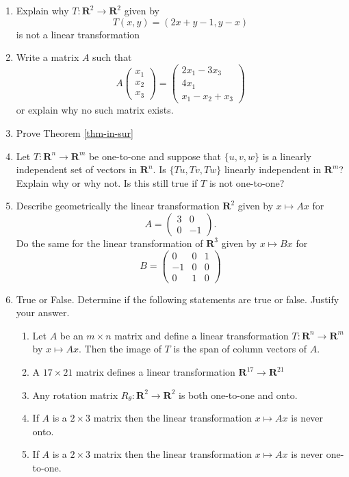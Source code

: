 \documentclass[12pt]{article}
\numberwithin{equation}{subsection}
\numberwithin{figure}{subsection}
\theoremstyle{note}
\begin{document}
\begin{enumerate}[label=\arabic*.]
	\item Explain why $T\colon \mathbf{R}^2\to\mathbf{R}^2$ given by \[ T(x,y)=(2x+y-1, y-x)\] is not a linear transformation
	\item Write a matrix $A$ such that \[ A\begin{pmatrix} x_1 \\ x_2 \\ x_3\end{pmatrix} = \begin{pmatrix} 2x_1 -3x_3 \\ 4x_1 \\ x_1 -x_2 +x_3\end{pmatrix} \] or explain why no such matrix exists. 
		\item Prove Theorem \ref{thm-in-sur}
	\item Let $T\colon \mathbf{R}^n\to \mathbf{R}^m$ be one-to-one and suppose that $\{u,v,w\}$ is a linearly independent set of vectors in $\mathbf{R}^n$. Is $\{Tu, Tv,Tw\}$ linearly independent in $\mathbf{R}^m$? Explain why or why not. Is this still true if $T$ is not one-to-one? 
	
	
	\item Describe geometrically the linear transformation $\mathbf{R}^2$ given by $x\mapsto Ax$ for \[A=\begin{pmatrix} 3 & 0 \\ 0 & -1\end{pmatrix}.\] Do the same for the linear transformation of $\mathbf{R}^3$ given by $x\mapsto Bx$ for \[B=\begin{pmatrix} 0 & 0 & 1 \\ -1 & 0 & 0 \\ 0 & 1 & 0 \end{pmatrix}\]
	
	
	\item True or False. Determine if the following statements are true or false. Justify your answer. 
	\begin{enumerate}
		\item Let $A$ be an $m\times n$ matrix and define a linear transformation $T\colon \mathbf{R}^n\to\mathbf{R}^m$ by $x\mapsto Ax$. Then the image of $T$ is the span of column vectors of $A$. 
		\item A $17\times 21$ matrix defines a linear transformation $\mathbf{R}^{17}\to\mathbf{R}^{21}$
		\item Any rotation matrix $R_{\theta}\colon \mathbf{R}^2\to\mathbf{R}^2$ is both one-to-one and onto. 
		\item If $A$ is a $2\times 3$ matrix then the linear transformation $x\mapsto Ax$ is never onto. 
		\item If $A$ is a $2\times 3$ matrix then the linear transformation $x\mapsto Ax$ is never one-to-one. 
	\end{enumerate}
	

\end{enumerate}
\end{document}
